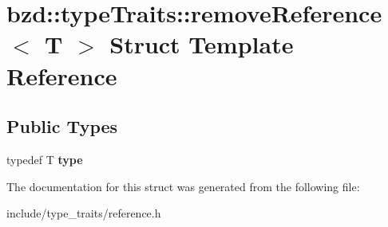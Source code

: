 \hypertarget{structbzd_1_1typeTraits_1_1removeReference}{}\section{bzd\+:\+:type\+Traits\+:\+:remove\+Reference$<$ T $>$ Struct Template Reference}
\label{structbzd_1_1typeTraits_1_1removeReference}
\subsection*{Public Types}
\begin{DoxyCompactItemize}
\item 
\mbox{\label{structbzd_1_1typeTraits_1_1removeReference_ad7406a01a4bffbc3f64166875167fdd5}} 
typedef T {\bfseries type}
\end{DoxyCompactItemize}


The documentation for this struct was generated from the following file\+:\begin{DoxyCompactItemize}
\item 
include/type\+\_\+traits/reference.\+h\end{DoxyCompactItemize}
